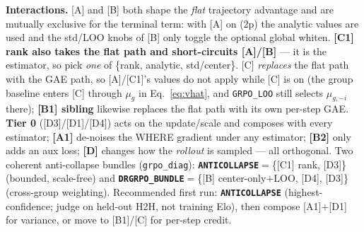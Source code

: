 \documentclass[11pt]{article}
\newcommand{\cd}[1]{\texttt{#1}}
\begin{document}
\noindent\textbf{Interactions.} [A] and [B] both shape the \emph{flat} trajectory advantage and are
mutually exclusive for the terminal term: with [A] on (2p) the analytic values are used and the
std/LOO knobs of [B] only toggle the optional global whiten. \textbf{[C1] rank also takes the flat path
and short-circuits [A]/[B]} --- it is the estimator, so pick \emph{one} of \{rank, analytic, std/center\}.
[C] \emph{replaces} the flat path with the GAE path, so [A]/[C1]'s values do not apply while [C] is on
(the group baseline enters [C] through $\mu_g$ in Eq.~\eqref{eq:vhat}, and \cd{GRPO\_LOO} still selects
$\mu_{g,-i}$ there); \textbf{[B1] sibling} likewise replaces the flat path with its own per-step GAE.
\textbf{Tier 0} ([D3]/[D1]/[D4]) acts on the update/scale and composes with every estimator; \textbf{[A1]}
de-noises the WHERE gradient under any estimator; \textbf{[B2]} only adds an aux loss; \textbf{[D]} changes
how the \emph{rollout} is sampled --- all orthogonal. Two coherent anti-collapse bundles (\cd{grpo\_diag}):
\textbf{\cd{ANTICOLLAPSE}}$=$\{[C1] rank, [D3]\} (bounded, scale-free) and
\textbf{\cd{DRGRPO\_BUNDLE}}$=$\{[B] center-only$+$LOO, [D4], [D3]\} (cross-group weighting). Recommended
first run: \textbf{\cd{ANTICOLLAPSE}} (highest-confidence; judge on held-out H2H, not training Elo), then
compose [A1]$+$[D1] for variance, or move to [B1]/[C] for per-step credit.
\end{document}
